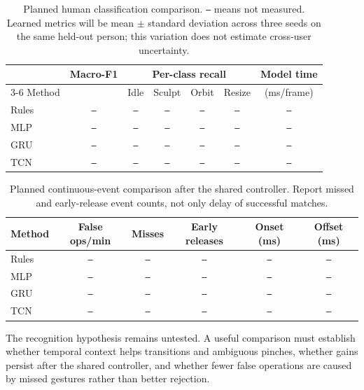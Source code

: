 \documentclass{article}
\newcommand{\missing}{\texttt{---}}
\begin{document}
\begin{table}[htbp]
\caption{Planned human classification comparison. \missing{} means not measured.
Learned metrics will be mean $\pm$ standard deviation across three seeds on the
same held-out person; this variation does not estimate cross-user uncertainty.}
\label{tab:recognition}
\centering
\begin{tabular}{@{}lcccccc@{}}
\toprule
 & Macro-F1 & \multicolumn{4}{c}{Per-class recall} & Model time \\
\cmidrule(lr){3-6}
Method & & Idle & Sculpt & Orbit & Resize & (ms/frame) \\
\midrule
Rules & \missing & \missing & \missing & \missing & \missing & \missing \\
MLP & \missing & \missing & \missing & \missing & \missing & \missing \\
GRU & \missing & \missing & \missing & \missing & \missing & \missing \\
TCN & \missing & \missing & \missing & \missing & \missing & \missing \\
\bottomrule
\end{tabular}
\end{table}

\begin{table}[htbp]
\caption{Planned continuous-event comparison after the shared controller.
Report missed and early-release event counts, not only delay of successful matches.}
\label{tab:events}
\centering
\begin{tabular}{@{}lccccc@{}}
\toprule
Method & False ops/min & Misses & Early releases & Onset (ms) & Offset (ms) \\
\midrule
Rules & \missing & \missing & \missing & \missing & \missing \\
MLP & \missing & \missing & \missing & \missing & \missing \\
GRU & \missing & \missing & \missing & \missing & \missing \\
TCN & \missing & \missing & \missing & \missing & \missing \\
\bottomrule
\end{tabular}
\end{table}

The recognition hypothesis remains untested. A useful comparison must establish
whether temporal context helps transitions and ambiguous pinches, whether gains
persist after the shared controller, and whether fewer false operations are caused
by missed gestures rather than better rejection.
\end{document}
